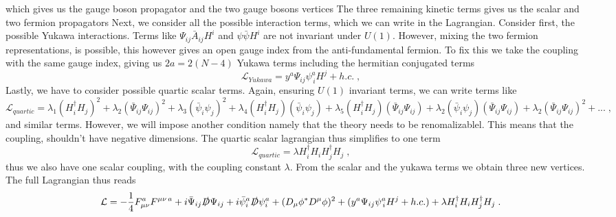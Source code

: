 which gives us the gauge boson propagator and the two gauge bosons vertices
The three remaining kinetic terms gives us the scalar and two fermion propagators 
Next, we consider all the possible interaction terms, which we can write in the Lagrangian. Consider first, the possible Yukawa interactions. Terms like $\Psi_{ij}\bar A_{ij}H^i$ and $\psi \bar \psi H^i$ are not invariant under $U(1)$. However, mixing the two fermion representations, is possible, this however gives an open gauge index from the anti-fundamental fermion. To fix this we take the coupling with the same gauge index, giving us $2a=2(N-4)$ Yukawa terms including the hermitian conjugated terms
\begin{equation}
    \mathcal{L}_{Yukawa}= y^a\Psi_{ij} \psi ^a_{\, i} H^j + h.c.\; ,
\end{equation}
Lastly, we have to consider possible quartic scalar terms. Again, ensuring $U(1)$ invariant terms, we can write terms like
\begin{equation}
    \mathcal{L}_{quartic}= 
    \lambda_1 (H^\dagger_i H_j)^2 
    + \lambda_2 (\bar \Psi_{ij}\Psi_{ij})^2
    +\lambda_3 (\bar \psi_{i}\psi_{j})^2
    +\lambda_4 (H^\dagger_i H_j)(\bar \psi_{i}\psi_{j})
    +\lambda_5 (H^\dagger_i H_j)(\bar \Psi_{ij}\Psi_{ij})
    +\lambda_2 (\bar \psi_{i}\psi_{j})(\bar \Psi_{ij}\Psi_{ij})
    +\lambda_2 (\bar \Psi_{ij}\Psi_{ij})^2+...\;,
\end{equation}
and similar terms. However, we will impose another condition namely that the theory needs to be renomalizablel. This means that the coupling, shouldn't have negative dimensions. The quartic scalar lagrangian thus simplifies to one term
\begin{equation}
    \mathcal{L}_{quartic}= 
    \lambda H^\dagger_i H_i H^\dagger_j H_j \;,
\end{equation}
thus we also have one scalar coupling, with the coupling constant $\lambda$. From the scalar and the yukawa terms we obtain three new vertices. The full Lagrangian thus reads
\begin{equation}
    \mathcal{L}= -\frac{1}{4} F_{\mu\nu}^a F^{\mu\nu\,a}+i \bar \Psi_{ij}\slashed{D}\Psi_{ij}+i \bar \psi_i^a\slashed{D}\psi_i^a+(D_\mu \phi^*D^\mu\phi)^2+(y^a\Psi_{ij} \psi ^a_{\, i} H^j + h.c.)+\lambda H^\dagger_i H_i H^\dagger_j H_j 
    \;.
\end{equation}

